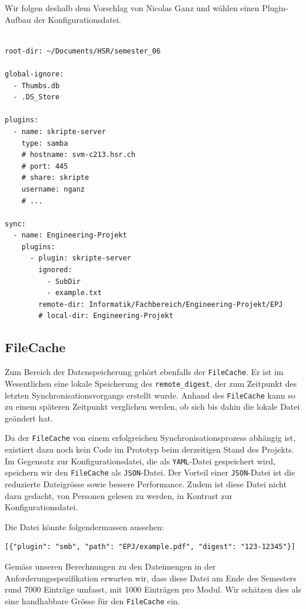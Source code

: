 \documentclass[a4paper]{article}
\begin{document}
Wir folgen deshalb dem Vorschlag von Nicolas Ganz und wählen einen Plugin-Aufbau der Konfigurationsdatei.

\begin{verbatim}

root-dir: ~/Documents/HSR/semester_06

global-ignore:
  - Thumbs.db
  - .DS_Store

plugins:
  - name: skripte-server
    type: samba
    # hostname: svm-c213.hsr.ch
    # port: 445
    # share: skripte
    username: nganz
    # ...

sync:
  - name: Engineering-Projekt
    plugins:
      - plugin: skripte-server
        ignored:
          - SubDir
          - example.txt
        remote-dir: Informatik/Fachbereich/Engineering-Projekt/EPJ
        # local-dir: Engineering-Projekt
\end{verbatim}

\subsection{FileCache}

Zum Bereich der Datenspeicherung gehört ebenfalls der \verb|FileCache|. Er ist im Wesentlichen eine lokale Speicherung des \verb|remote_digest|, der zum Zeitpunkt des letzten Synchronisationsvorgangs erstellt wurde. Anhand des \verb|FileCache| kann so zu einem späteren Zeitpunkt verglichen werden, ob sich bis dahin die lokale Datei geändert hat.

Da der \verb|FileCache| von einem erfolgreichen Synchronisationsprozess abhängig ist, existiert dazu noch kein Code im Prototyp beim derzeitigen Stand des Projekts. Im Gegensatz zur Konfigurationsdatei, die als \verb|YAML|-Datei gespeichert wird, speichern wir den \verb|FileCache| als \verb|JSON|-Datei. Der Vorteil einer \verb|JSON|-Datei ist die reduzierte Dateigrösse sowie bessere Performance. Zudem ist diese Datei nicht dazu gedacht, von Personen gelesen zu werden, in Kontrast zur Konfigurationsdatei.

Die Datei könnte folgendermassen aussehen:

\begin{verbatim}
[{"plugin": "smb", "path": "EPJ/example.pdf", "digest": "123-12345"}]
\end{verbatim}

Gemäss unseren Berechnungen zu den Dateimengen in der Anforderungsspezifikation erwarten wir, dass diese Datei am Ende des Semesters rund 7000 Einträge umfasst, mit 1000 Einträgen pro Modul. Wir schätzen dies als eine handhabbare Grösse für den \verb|FileCache| ein.
\end{document}
